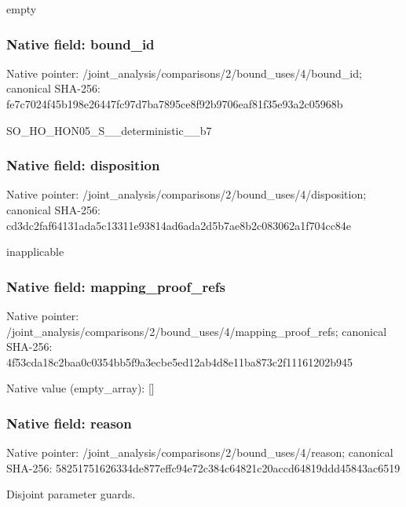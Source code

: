\documentclass[10pt,a4paper]{article}
\begin{document}
\begingroup\raggedright\sloppy empty\par\endgroup

\subsubsection{Native field: bound\_\allowbreak{}id}
Native pointer: /joint\_\allowbreak{}analysis/comparisons/2/bound\_\allowbreak{}uses/4/bound\_\allowbreak{}id; canonical SHA-256: fe7c7024f45b198e26447fc97d7ba7895ce8f92b9706eaf81f35e93a2c05968b

\begingroup\raggedright\sloppy SO\_\allowbreak{}HO\_\allowbreak{}HON05\_\allowbreak{}S\_\allowbreak{}\_\allowbreak{}deterministic\_\allowbreak{}\_\allowbreak{}b7\par\endgroup

\subsubsection{Native field: disposition}
Native pointer: /joint\_\allowbreak{}analysis/comparisons/2/bound\_\allowbreak{}uses/4/disposition; canonical SHA-256: cd3dc2faf64131ada5c13311e93814ad6ada2d5b7ae8b2c083062a1f704cc84e

\begingroup\raggedright\sloppy inapplicable\par\endgroup

\subsubsection{Native field: mapping\_\allowbreak{}proof\_\allowbreak{}refs}
Native pointer: /joint\_\allowbreak{}analysis/comparisons/2/bound\_\allowbreak{}uses/4/mapping\_\allowbreak{}proof\_\allowbreak{}refs; canonical SHA-256: 4f53cda18c2baa0c0354bb5f9a3ecbe5ed12ab4d8e11ba873c2f11161202b945

Native value (empty\_\allowbreak{}array): []

\subsubsection{Native field: reason}
Native pointer: /joint\_\allowbreak{}analysis/comparisons/2/bound\_\allowbreak{}uses/4/reason; canonical SHA-256: 58251751626334de877effc94e72c384c64821c20accd64819ddd45843ac6519

\begingroup\raggedright\sloppy Disjoint parameter guards.\par\endgroup
\end{document}
